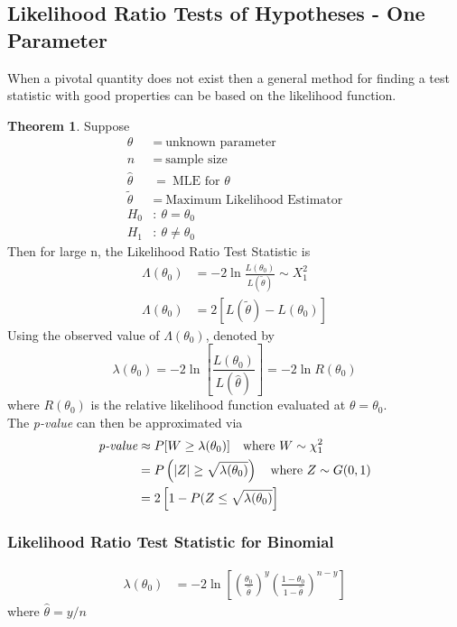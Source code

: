 \documentclass[12pt]{article}
\theoremstyle{definition}
\newtheorem*{theorem}{Theorem}
\begin{document}
  \subsection{Likelihood Ratio Tests of Hypotheses - One Parameter}
  When a pivotal quantity does not exist then a general method for finding a test statistic with good properties can be based on the likelihood function.
  \begin{theorem}
    Suppose
    \begin{align*}
      \theta &= ~\text{unknown parameter} \\
      n &= ~\text{sample size} \\
      \hat{\theta} &= ~\text{MLE for $\theta$} \\
      \widetilde{\theta} &= ~\text{Maximum Likelihood Estimator} \\
      H_{0} &: ~\theta = \theta_{0} \\
      H_{1} &: ~\theta \not = \theta_{0}
    \end{align*}
    Then for large n, the Likelihood Ratio Test Statistic is
    \begin{align*}
    \Lambda(\theta_{0}) &= -2\ln{\frac{L(\theta_{0})}{L(\widetilde{\theta})}} \sim X_{1}^{2} \\
    \Lambda(\theta_{0}) &= 2[L(\widetilde{\theta}) - L(\theta_{0})]
    \end{align*}
    Using the observed value of $\Lambda(\theta_{0})$, denoted by
    $$
    \lambda(\theta_{0})
    = -2\ln{\left[\frac{L(\theta_{0})}{L(\hat{\theta})}\right]}
    = -2\ln{R(\theta_0)}
    $$
    where $R(\theta_0)$ is the relative likelihood function evaluated at $\theta = \theta_0$. \\
    The \emph{p-value} can then be approximated via
    \begin{align*}
      \emph{p-value}
      &\approx P[W\geq \lambda(\theta_0)]~~~\text{where }W\sim \chi_{1}^{2} \\
      &= P\left(|Z|\geq \sqrt{\lambda(\theta_0)}\right) ~~~\text{where }Z\sim G(0, 1) \\
      &= 2\left[1 - P(Z \leq \sqrt{\lambda(\theta_0)}\right]
    \end{align*}
  \end{theorem}

  \subsubsection{Likelihood Ratio Test Statistic for Binomial}
  \begin{align*}
    \lambda(\theta_0)
    &= -2\ln{\left[\left(\frac{\theta_0}{\hat{\theta}}\right)^{y}\left(\frac{1 - \theta_0}{1 - \hat{\theta}}\right)^{n - y}\right]}
  \end{align*}
  where $\hat{\theta} = y/n$
\end{document}
